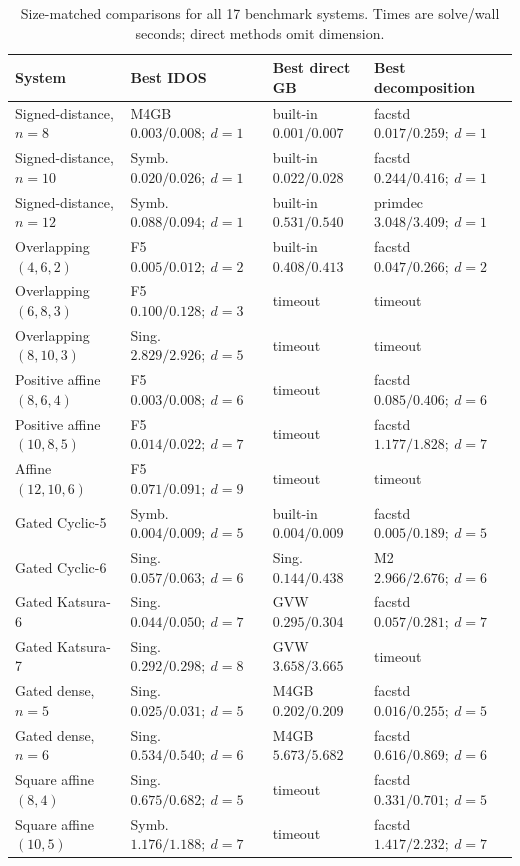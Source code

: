 \documentclass[12pt]{article}
\begin{document}
\begin{table}[htbp]
\centering
\scriptsize
\setlength{\tabcolsep}{4pt}
\begin{tabular}{l l l l}
\toprule
System & Best IDOS & Best direct GB & Best decomposition \\
\midrule
Signed-distance, $n=8$ & M4GB $0.003/0.008;\ d=1$ & built-in $0.001/0.007$ & facstd $0.017/0.259;\ d=1$ \\
Signed-distance, $n=10$ & Symb. $0.020/0.026;\ d=1$ & built-in $0.022/0.028$ & facstd $0.244/0.416;\ d=1$ \\
Signed-distance, $n=12$ & Symb. $0.088/0.094;\ d=1$ & built-in $0.531/0.540$ & primdec $3.048/3.409;\ d=1$ \\
Overlapping $(4,6,2)$ & F5 $0.005/0.012;\ d=2$ & built-in $0.408/0.413$ & facstd $0.047/0.266;\ d=2$ \\
Overlapping $(6,8,3)$ & F5 $0.100/0.128;\ d=3$ & timeout & timeout \\
Overlapping $(8,10,3)$ & Sing. $2.829/2.926;\ d=5$ & timeout & timeout \\
Positive affine $(8,6,4)$ & F5 $0.003/0.008;\ d=6$ & timeout & facstd $0.085/0.406;\ d=6$ \\
Positive affine $(10,8,5)$ & F5 $0.014/0.022;\ d=7$ & timeout & facstd $1.177/1.828;\ d=7$ \\
Affine $(12,10,6)$ & F5 $0.071/0.091;\ d=9$ & timeout & timeout \\
Gated Cyclic-5 & Symb. $0.004/0.009;\ d=5$ & built-in $0.004/0.009$ & facstd $0.005/0.189;\ d=5$ \\
Gated Cyclic-6 & Sing. $0.057/0.063;\ d=6$ & Sing. $0.144/0.438$ & M2 $2.966/2.676;\ d=6$ \\
Gated Katsura-6 & Sing. $0.044/0.050;\ d=7$ & GVW $0.295/0.304$ & facstd $0.057/0.281;\ d=7$ \\
Gated Katsura-7 & Sing. $0.292/0.298;\ d=8$ & GVW $3.658/3.665$ & timeout \\
Gated dense, $n=5$ & Sing. $0.025/0.031;\ d=5$ & M4GB $0.202/0.209$ & facstd $0.016/0.255;\ d=5$ \\
Gated dense, $n=6$ & Sing. $0.534/0.540;\ d=6$ & M4GB $5.673/5.682$ & facstd $0.616/0.869;\ d=6$ \\
Square affine $(8,4)$ & Sing. $0.675/0.682;\ d=5$ & timeout & facstd $0.331/0.701;\ d=5$ \\
Square affine $(10,5)$ & Symb. $1.176/1.188;\ d=7$ & timeout & facstd $1.417/2.232;\ d=7$ \\
\bottomrule
\end{tabular}
\caption{Size-matched comparisons for all 17 benchmark systems.  Times are
solve/wall seconds; direct methods omit dimension.}
\label{tab:baseline-comparison}
\end{table}
\end{document}
